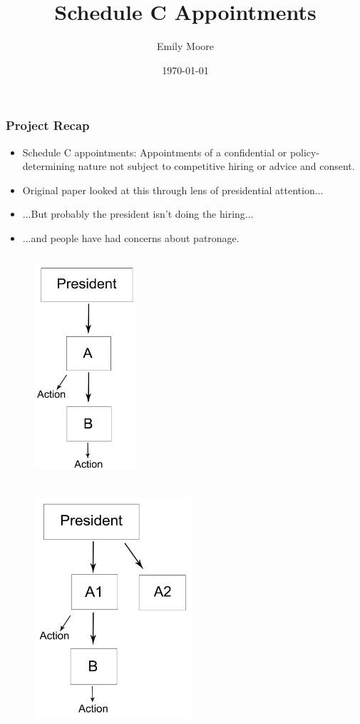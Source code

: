 \documentclass{beamer}
\title[ Schedule C Appointments]{Schedule C Appointments}
\author{Emily Moore}
\institute[WUSTL]
{
Washington University-St. Louis \\
\medskip
{\emph{emily.moore@wustl.edu}}
}
\date{\today}
\begin{document}


\begin{frame}
\titlepage
\end{frame}

\begin{frame}
\frametitle{Project Recap}
\begin{itemize} \addtolength{\itemsep}{1\baselineskip}
\item Schedule C appointments: Appointments of a confidential or policy-determining nature not subject to competitive hiring or advice and consent.
\item Original paper looked at this through lens of presidential attention...
\item ...But probably the president isn't doing the hiring...
\item ...and people have had concerns about patronage.
\end{itemize}
\end{frame}

\begin{frame}
\centering
\begin{figure}
\includegraphics[height=3.25in,width=1.5in]{ModelV1.pdf}
\end{figure}
\end{frame}

\begin{frame}
\centering
\begin{figure}
\includegraphics[height=3.4in,width=2.3in]{ModelV2.pdf}
\end{figure}
\end{frame}
\end{document}
